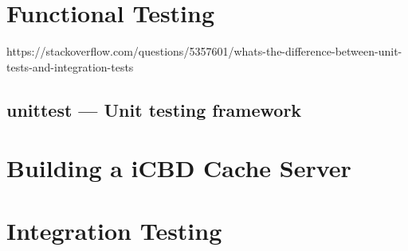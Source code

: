 \section{Functional Testing}
\label{sec:functional_testing}

https://stackoverflow.com/questions/5357601/whats-the-difference-between-unit-tests-and-integration-tests


\subsection{unittest — Unit testing framework}
\label{sub:unittest}


\section{Building a iCBD Cache Server}
\label{sec:cache_server}


\section{Integration Testing}
\label{sub:integration_testing}